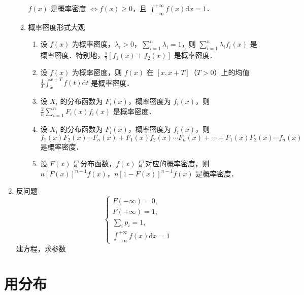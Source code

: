 \begin{enumerate}
\begin{enumerate}
                    $f(x)$ 是概率密度 $\Leftrightarrow f(x) \geqslant 0$，且 $\int_{-\infty}^{+\infty} f(x) \mathrm{d}x = 1$．
              \item 概率密度形式大观
                    \begin{enumerate}
                        \item 设 $f(x)$ 为概率密度，$\lambda_i > 0$，$\sum_{i=1}^{n} \lambda_i = 1$，则 $\sum_{i=1}^{n} \lambda_i f_i(x)$ 是概率密度．特别地，$\frac{1}{2}[f_1(x) + f_2(x)]$ 是概率密度．
                        \item 设 $f(x)$ 为概率密度，则 $f(x)$ 在 $[x, x+T]$（$T > 0$）上的均值 $\frac{1}{T} \int_{x}^{x+T} f(t) \mathrm{d}t$ 是概率密度．
                        \item 设 $X_i$ 的分布函数为 $F_i(x)$，概率密度为 $f_i(x)$，则 $\frac{2}{n}\sum_{i=1}^{n}F_i(x)f_i(x)$ 是概率密度．
                        \item 设 $X_i$ 的分布函数为 $F_i(x)$，概率密度为 $f_i(x)$，则 $f_1(x)F_2(x)\cdots F_n(x) + F_1(x)f_2(x)\cdots F_n(x) + \cdots + F_1(x)F_2(x)\cdots f_n(x)$ 是概率密度．
                        \item 设 $F(x)$ 是分布函数，$f(x)$ 是对应的概率密度，则 $n[F(x)]^{n-1}f(x)$，$n[1-F(x)]^{n-1}f(x)$ 是概率密度．
                    \end{enumerate}
          \end{enumerate}
    \item 反问题
          $$\begin{cases}F(-\infty)=0,\\F(+\infty)=1,\\\sum_{i}p_{i}=1,\\\int_{-\infty}^{+\infty}f(x)\mathrm{d}x=1 \end{cases}$$
          建方程，求参数
\end{enumerate}
\section{用分布}
\DOne

